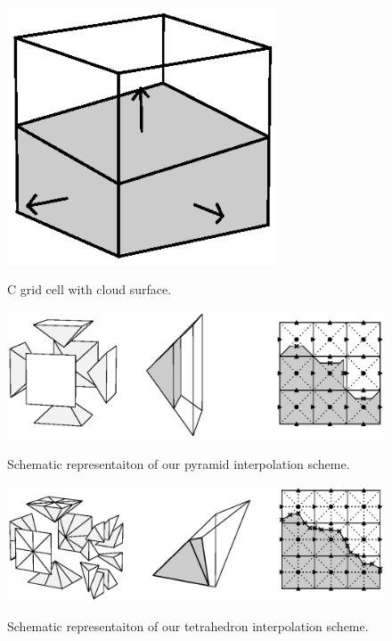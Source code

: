 \documentclass[12pt]{article}
\begin{document}

\begin{figure}[t]
  \noindent\includegraphics[width=19pc,angle=0]{./figures/cell_diagram.eps}\\
  \caption{C grid cell with cloud surface.}\label{fig:cell_diagram}
\end{figure}

\begin{figure}[t]
  \noindent\includegraphics[width=40pc,angle=0]{./figures/pyramid_scheme.eps}\\
  \caption{Schematic representaiton of our pyramid interpolation 
scheme.}\label{fig:pyramid_scheme}
\end{figure}

\begin{figure}[t]
  \noindent\includegraphics[width=40pc,angle=0]{./figures/tetrahedral_scheme.eps}\\
  \caption{Schematic representaiton of our tetrahedron interpolation 
scheme.}\label{fig:tetrahedral_scheme}
\end{figure}
\end{document}
